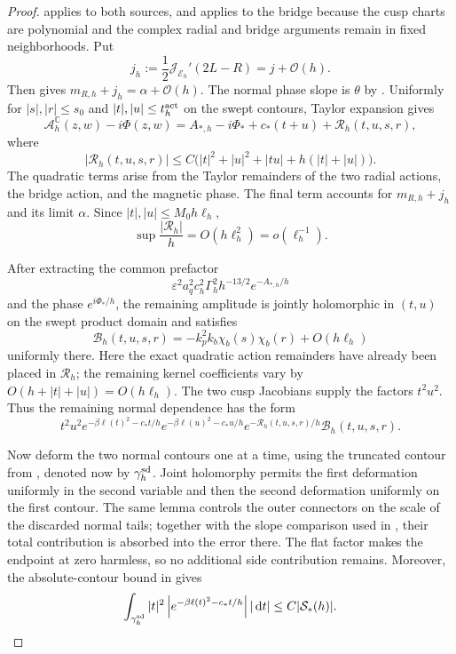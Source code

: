 \documentclass[11pt]{article}
\newcommand{\C}{\mathbb C}
\newcommand{\eps}{\varepsilon}
\newcommand{\dd}{\,\mathrm d}
\newcommand{\cA}{\mathcal A}
\newcommand{\cE}{\mathcal E}
\newcommand{\cJ}{\mathcal J}
\newcommand{\cO}{\mathcal O}
\begin{document}
\begin{proof}
 applies to both sources, and
 applies to the bridge because the cusp
charts are polynomial and the complex radial and bridge arguments remain in
fixed neighborhoods.  Put
\begin{equation}\label{eq:jh}
 j_h:=\frac12\cJ_{\cE_h}'(2L-R)=j+\cO(h).
\end{equation}
Then  gives
$m_{R,h}+j_h=\alpha+\cO(h)$.  The normal phase slope is $\theta$ by
.  Uniformly for $|s|,|r|\le s_0$ and
$|t|,|u|\le t_h^{\rm act}$ on the swept contours, Taylor expansion gives
\begin{equation}\label{eq:coupled-active-phase}
 \cA_h^\C(z,w)-i\Phi(z,w)
 =A_{*,h}-i\Phi_*+c_*(t+u)+\mathcal R_h(t,u,s,r),
\end{equation}
where
\begin{equation}\label{eq:coupled-active-remainder}
 |\mathcal R_h(t,u,s,r)|
 \le C\bigl(|t|^2+|u|^2+|tu|+h(|t|+|u|)\bigr).
\end{equation}
The quadratic terms arise from the Taylor remainders of the two
radial actions, the bridge action, and the magnetic phase.  The final term accounts for
$m_{R,h}+j_h$ and its limit $\alpha$.  Since
$|t|,|u|\le M_0h\ell_h$,
\begin{equation}\label{eq:coupled-remainder-small}
 \sup\frac{|\mathcal R_h|}{h}=O(h\ell_h^2)=o(\ell_h^{-1}).
\end{equation}

After extracting the common prefactor
\[
\eps^2a_q^2c_h^2\Gamma_h^2h^{-13/2}e^{-A_{*,h}/h}
\] 
and the phase $e^{i\Phi_*/h}$, the remaining amplitude is jointly
holomorphic in $(t,u)$ on the swept product domain and satisfies
\begin{equation}\label{eq:active-amplitude-limit}
 \mathcal B_h(t,u,s,r)
 =-k_p^2k_b\chi_b(s)\chi_b(r)+O(h\ell_h)
\end{equation}
uniformly there.  Here the exact quadratic action remainders have already
been placed in $\mathcal R_h$; the remaining kernel coefficients vary by
$O(h+|t|+|u|)=O(h\ell_h)$.  The two cusp Jacobians supply the factors
$t^2u^2$.  Thus the remaining normal dependence has the form
\[
t^2u^2
e^{-\beta\ell(t)^2-c_*t/h}
e^{-\beta\ell(u)^2-c_*u/h}
e^{-\mathcal R_h(t,u,s,r)/h}
\mathcal B_h(t,u,s,r).
\]

Now deform the two normal contours one at a time, using the truncated contour from
, denoted now by $\gamma_h^{\rm sd}$.  Joint holomorphy permits the first
deformation uniformly in the second variable and then the second deformation
uniformly on the first contour.  The same lemma controls the
outer connectors on the scale of the discarded normal tails; together with
the slope comparison used in , their total
contribution is absorbed into the error there. The flat factor makes the
endpoint at zero harmless, so no additional side contribution remains.
Moreover, the absolute-contour bound in
 gives
\[
 \int_{\gamma_h^{\rm sd}}|t|^2
 \left|e^{-\beta\ell(t)^2-c_*t/h}\right||\dd t|
 \le C|\mathcal S_*(h)|.
\]


\end{proof}
\end{document}
